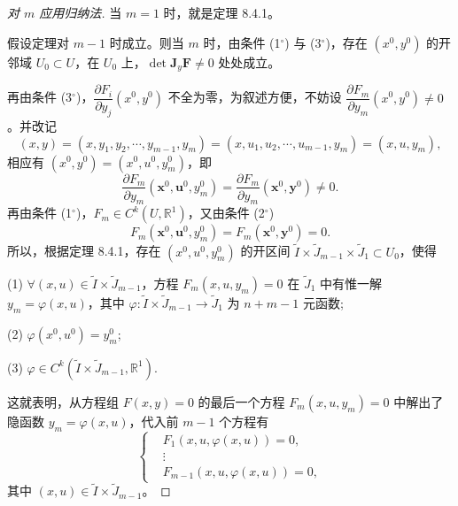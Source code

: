 \begin{proof}[对 $m$ 应用归纳法]
当 $m = 1$ 时，就是定理 8.4.1。

假设定理对 $m - 1$ 时成立。则当 $m$ 时，由条件 (1$^\circ$) 与 (3$^\circ$)，存在 $(x^{0},y^{0})$ 的开邻域 $U_{0} \subset U$，在 $U_{0}$ 上，$\det \boldsymbol{J}_{y}\boldsymbol{F} \neq 0$ 处处成立。

再由条件 (3$^\circ$)，$\dfrac{\partial F_{i}}{\partial y_{j}}(x^{0},y^{0})$ 不全为零，为叙述方便，不妨设 $\dfrac{\partial F_{m}}{\partial y_{m}}(x^{0},y^{0}) \neq 0$。并改记
\[
  (x,y) = (x,y_{1},y_{2},\cdots,y_{m-1},y_{m}) = (x,u_{1},u_{2},\cdots,u_{m-1},y_{m}) = (x,u,y_{m}),
\]
相应有 $(x^{0},y^{0}) = (x^{0},u^{0},y_{m}^{0})$，即
\[
  \frac{\partial F_{m}}{\partial y_{m}}(\boldsymbol{x}^{0},\boldsymbol{u}^{0},y_{m}^{0}) = \frac{\partial F_{m}}{\partial y_{m}}(\boldsymbol{x}^{0},\boldsymbol{y}^{0}) \neq 0.
\]
再由条件 (1$^\circ$)，$F_{m} \in C^{k}(U,\mathbb{R}^{1})$，又由条件 (2$^\circ$)
\[
  F_{m}(\boldsymbol{x}^{0},\boldsymbol{u}^{0},y_{m}^{0}) = F_{m}(\boldsymbol{x}^{0},\boldsymbol{y}^{0}) = 0.
\]
所以，根据定理 8.4.1，存在 $(x^{0},u^{0},y_{m}^{0})$ 的开区间 $\widetilde{I} \times \widetilde{J}_{m-1} \times \widetilde{J}_{1} \subset U_{0}$，使得

(1) $\forall (x,u) \in \widetilde{I} \times \widetilde{J}_{m-1}$，方程 $F_{m}(x,u,y_{m}) = 0$ 在 $\widetilde{J}_{1}$ 中有惟一解 $y_{m} = \varphi(x,u)$，其中 $\varphi: \widetilde{I} \times \widetilde{J}_{m-1} \to \widetilde{J}_{1}$ 为 $n+m-1$ 元函数;

(2) $\varphi(x^{0},u^{0}) = y_{m}^{0}$;

(3) $\varphi \in C^{k}(\widetilde{I} \times \widetilde{J}_{m-1},\mathbb{R}^{1})$.

这就表明，从方程组 $F(x,y) = 0$ 的最后一个方程 $F_{m}(x,u,y_{m}) = 0$ 中解出了隐函数 $y_{m} = \varphi(x,u)$，代入前 $m-1$ 个方程有
\[
  \left\{\begin{aligned}
    {} & F_{1}(x,u,\varphi(x,u)) = 0, \\
    {} & \vdots \\
    {} & F_{m-1}(x,u,\varphi(x,u)) = 0,
  \end{aligned}\right.
\]
其中 $(x,u) \in \widetilde{I} \times \widetilde{J}_{m-1}$。


\end{proof}
